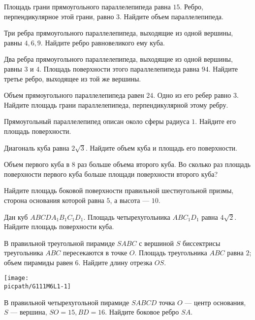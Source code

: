 %
%

\begin{class}[number=1]
	\begin{listofex}
		\item Площадь грани прямоугольного параллелепипеда равна \( 15 \). Ребро, перпендикулярное этой грани, равно \(3\). Найдите объем параллелепипеда.
		\item Три ребра прямоугольного параллелепипеда, выходящие из одной вершины, равны \(4, 6, 9\). Найдите ребро равновеликого ему куба.
		\item Два ребра прямоугольного параллелепипеда, выходящие из одной вершины, равны \(3\) и \(4\). Площадь поверхности этого параллелепипеда равна \(94\). Найдите третье ребро, выходящее из той же вершины.
		\item Объем прямоугольного параллелепипеда равен \(24\). Одно из его ребер равно \(3\). Найдите площадь грани параллелепипеда, перпендикулярной этому ребру.
		\item Прямоугольный параллелепипед описан около сферы радиуса \(1\). Найдите его площадь поверхности.
		\item Диагональ куба равна \( 2\sqrt{3} \). Найдите объем куба и площадь его поверхности.
		\item Объем первого куба в \( 8 \) раз больше объема второго куба. Во сколько раз площадь поверхности первого куба больше площади поверхности второго куба?
		\item Найдите площадь боковой поверхности правильной шестиугольной призмы, сторона основания которой равна \( 5 \), а высота  --- \( 10 \).
		\item Дан куб \( ABCDA_1B_1C_1D_1 \). Площадь четырехугольника \( ABC_1D_1 \) равна \( 4\sqrt{2} \). Найдите площадь поверхности куба.
		\item 
		\begin{minipage}[t]{\bodywidth}
			В правильной треугольной пирамиде \(SABC\) с вершиной \(S\) биссектрисы треугольника \(ABC\) пересекаются в точке \(O\). Площадь треугольника \(ABC\) равна \(2\); объем пирамиды равен \(6\). Найдите длину отрезка \(OS\).
		\end{minipage}
		\hspace{0.02\linewidth}
		\begin{minipage}[t]{\picwidth}
			\texttt{[image: \\picpath/G111M6L1-1]}
		\end{minipage}
		\item В правильной четырехугольной пирамиде \(SABCD\) точка \(O\) --- центр основания, \(S\) --- вершина, \(SO=15, BD=16\). Найдите боковое ребро \(SA\).
		

\end{listofex}
\end{class}
